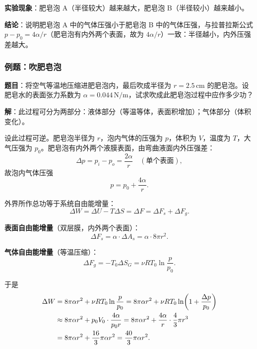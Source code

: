 \documentclass[UTF8]{ctexart}
\theoremstyle{definition}
\begin{document}
\textbf{实验现象}：肥皂泡 A（半径较大）越来越大，肥皂泡 B（半径较小）越来越小。

\textbf{结论}：说明肥皂泡 A 中的气体压强小于肥皂泡 B 中的气体压强，与拉普拉斯公式 $p-p_0=4\alpha/r$（肥皂泡有内外两个表面，故为 $4\alpha/r$）一致：半径越小，内外压强差越大。

\subsubsection*{例题：吹肥皂泡}

\textbf{题目}：将空气等温地压缩进肥皂泡内，最后吹成半径为 $r=2.5\,\mathrm{cm}$ 的肥皂泡。设肥皂水的表面张力系数为 $\alpha=0.044\,\mathrm{N/m}$，试求吹成此肥皂泡过程中应作多少功？

\textbf{解}：此过程可分为两部分：液体部分（等温等体，表面积增加）；气体部分（体积变化）。

设此过程可逆。肥皂泡半径为 $r$，泡内气体的压强为 $p$，体积为 $V$，温度为 $T$，大气压强为 $p_0$。肥皂泡有内外两个液膜表面，由弯曲液面内外压强差：
\begin{equation}
\Delta p = p_i - p_o = \frac{2\alpha}{r}\quad(\text{单个表面}),
\end{equation}
故泡内气体压强
\begin{equation}
p = p_0 + \frac{4\alpha}{r}.
\end{equation}

外界所作总功等于系统自由能增量：
\begin{equation}
\Delta W = \Delta U - T\Delta S = \Delta F = \Delta F_s + \Delta F_g.
\end{equation}

\textbf{表面自由能增量}（双层膜，内外两个表面）：
\begin{equation}
\Delta F_s = \alpha\cdot\Delta A_s = \alpha\cdot 8\pi r^2.
\end{equation}

\textbf{气体自由能增量}（等温压缩）：
\begin{equation}
\Delta F_g = -T_0\Delta S_G = \nu RT_0\ln\frac{p}{p_0}.
\end{equation}

于是
\begin{align}
\Delta W &= 8\pi\alpha r^2 + \nu RT_0\ln\frac{p}{p_0}
= 8\pi\alpha r^2 + \nu RT_0\ln\!\left(1+\frac{\Delta p}{p_0}\right) \notag\\
&\approx 8\pi\alpha r^2 + p_0V_0\cdot\frac{4\alpha}{p_0r}
= 8\pi\alpha r^2 + \frac{4\alpha}{r}\cdot\frac{4}{3}\pi r^3 \notag\\
&= 8\pi\alpha r^2 + \frac{16}{3}\pi\alpha r^2
= \frac{40}{3}\pi\alpha r^2.
\end{align}
\end{document}
